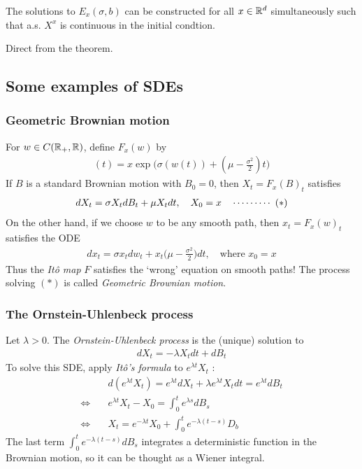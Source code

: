 \documentclass[10pt,a4paper]{article}
\newenvironment{proof}
{\begin{changemargin}{0.5cm}{0.5cm} 
	}%
	{\end{changemargin}
}
\newenvironment{p}
{\begin{proof} 
	}%
	{\end{proof}
}
\begin{document}
\corr The solutions to $E_x(\sigma, b)$ can be constructed for all $x\in \mathbb{R}^d$ simultaneously such that a.s. $X^x$ is continuous in the initial condtion.
\begin{p}
\pf Direct from the theorem.
\end{p}

\subsection{Some examples of SDEs}

\subsubsection*{Geometric Brownian motion}

For $w \in C(\mathbb{R}_+, \mathbb{R})$, define $F_x(w)$ by
\begin{align*}
[F_x(w)](t) = x\exp \big( \sigma(w(t)) + (\mu - \frac{\sigma^2}{2})t \big)
\end{align*}
If $B$ is a standard Brownian motion with $B_0 =0$, then $X_t = F_x(B)_t$ satisfies 
\begin{align*}
dX_t = \sigma X_t dB_t + \mu X_t dt, \quad X_0 = x \quad \cdots\cdots\cdots\,\,(*) 
\end{align*}
On the other hand, if we choose $w$ to be any smooth path, then $x_t = F_x(w)_t$ satisfies the ODE
\begin{align*}
dx_t = \sigma x_t dw_t + x_t \big( \mu -\frac{\sigma^2}{2} \big) dt, \quad \text{where } x_0 =x
\end{align*}
Thus the \emph{It\^o map} $F$ satisfies the `wrong' equation on smooth paths! The process solving $(*)$ is called \emph{Geometric Brownian motion}.
\s

\subsubsection*{The Ornstein-Uhlenbeck process}

Let $\lambda >0$. The \emph{Ornstein-Uhlenbeck process} is the (unique) solution to
\begin{align*}
dX_t = -\lambda X_t dt + dB_t
\end{align*}
To solve this SDE, apply \emph{It\^o's formula} to $e^{\lambda t} X_t$ :
\begin{align*}
& d(e^{\lambda t} X_t) = e^{\lambda t} dX_t + \lambda e^{\lambda t} X_t dt = e^{\lambda t} dB_t \\
\Leftrightarrow \quad & e^{\lambda t} X_t - X_0 = \int_0^t e^{\lambda s} dB_s \\
\Leftrightarrow \quad & X_t = e^{-\lambda t}X_0 +\int_0^t e^{-\lambda(t-s)} D_b
\end{align*}
The last term $\int_0^t e^{-\lambda(t-s)}dB_s$ integrates a deterministic function in the Brownian motion, so it can be thought as a Wiener integral.
\s
\end{document}
